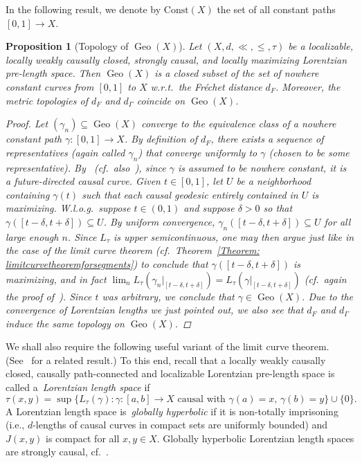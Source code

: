 \documentclass[a4paper,11pt]{article}
\numberwithin{equation}{section}
\theoremstyle{plain}
\newtheorem{Proposition}[Definition]{Proposition}
\theoremstyle{definition}
\DeclareMathOperator{\Geo}{Geo}
\begin{document}
In the following result, we denote by $\mathrm{Const}(X)$ the set of all constant paths $[0,1]\to X$.
\begin{Proposition}[Topology of $\Geo(X)$]
\label{Proposition: TopologyofGeoX}
Let $(X,d,\ll,\leq,\tau)$ be a localizable, locally weakly causally closed, strongly causal, and locally maximizing Lorentzian pre-length space. Then $\Geo(X)$ is a closed subset of the set of nowhere constant curves from $[0,1]$ to $X$ w.r.t.\ the Fr\'{e}chet distance $d_F$. Moreover, the metric topologies of $d_F$ and $d_\Gamma$ coincide on $\Geo(X)$.
\begin{proof}
    Let $(\gamma_n) \subseteq \Geo(X)$ converge to the equivalence class of a nowhere constant path $\gamma \colon [0,1] \to X$. By definition of $d_F$, there exists a sequence of representatives (again called $\gamma_n$) that converge uniformly to $\gamma$ (chosen to be some representative). By~\cite[Lem.\ 3.6]{kunzinger2018lorentzian} (cf.\ also~\cite{hau2020causal}), since $\gamma$ is assumed to be nowhere constant, it is a future-directed causal curve. Given $t \in [0,1]$, let $U$ be a neighborhood containing $\gamma(t)$ such that each causal geodesic entirely contained in $U$ is maximizing. W.l.o.g.\ suppose $t \in (0,1)$ and suppose $\delta >0$ so that $\gamma([t-\delta,t+\delta]) \subseteq U$. By uniform convergence, $\gamma_n([t-\delta,t+\delta])\subseteq U$ for all large enough $n$. Since $L_{\tau}$ is upper semicontinuous, one may then argue just like in the case of the limit curve theorem (cf.\ Theorem~\ref{Theorem: limitcurvetheoremforsegments}) to conclude that $\gamma([t-\delta,t+\delta])$ is maximizing, and in fact $\lim_n L_{\tau}(\gamma_n|_{[t-\delta,t+\delta]}) = L_{\tau}(\gamma|_{[t-\delta,t+\delta]})$ (cf.\ again the proof of~\cite[Thm.\ 2.23]{beran2023splitting}). Since $t$ was arbitrary, we conclude that $\gamma \in \Geo(X)$. Due to the convergence of Lorentzian lengths we just pointed out, we also see that $d_{F}$ and $d_{\Gamma}$ induce the same topology on $\Geo(X)$.
\end{proof}
\end{Proposition}



\medskip
We shall also require the following useful variant of the limit curve theorem. (See~\cite[Thm.\ 2]{EVP21} for a related result.) To this end, recall that a locally weakly causally closed, causally path-connected and localizable Lorentzian pre-length space is called a~\emph{Lorentzian length space\/} if
\begin{equation}
    \tau(x,y) = \sup \{L_\tau(\gamma) : \gamma \colon [a,b] \to X \text{ causal with }\gamma(a) = x, \, \gamma(b) = y\} \cup \{0\}.
\end{equation}
A Lorentzian length space is~\emph{globally hyperbolic\/} if it is non-totally imprisoning (i.e., $d$-lengths of causal curves in compact sets are uniformly bounded) and $J(x,y)$ is compact for all $x,y \in X$. Globally hyperbolic Lorentzian length spaces are strongly causal, cf.\ \cite[Thm.\ 3.26]{kunzinger2018lorentzian}.
\end{document}
